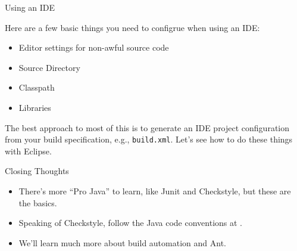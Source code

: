 \documentclass{beamer}
\begin{document}
\begin{frame}[fragile]{Using an IDE}


Here are a few basic things you need to configrue when using an IDE:
\begin{itemize}
\item Editor settings for non-awful source code
\item Source Directory
\item Classpath
\item Libraries
\end{itemize}
The best approach to most of this is to generate an IDE project configuration from your build specification, e.g., {\tt build.xml}.  Let's see how to do these things with Eclipse.

\end{frame}


\begin{frame}[fragile]{Closing Thoughts}


\begin{itemize}
\item  There's more ``Pro Java'' to learn, like Junit and Checkstyle, but these are the basics.
\item Speaking of Checkstyle, follow the Java code conventions at .
\item We'll learn much more about build automation and Ant.
\end{itemize}


\end{frame}
\end{document}
